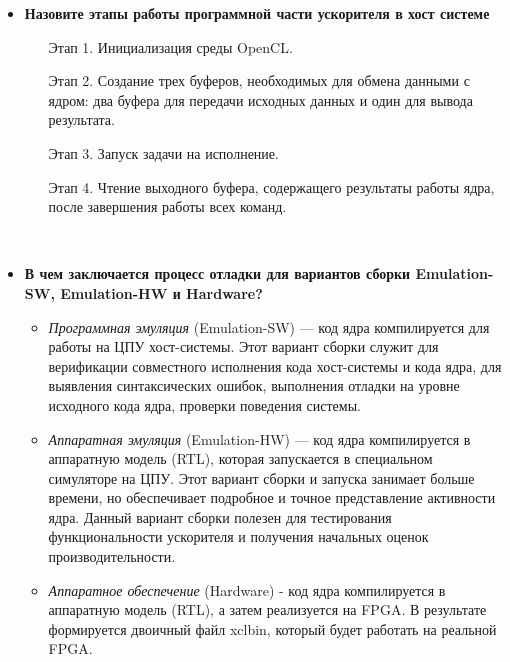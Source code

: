 \begin{itemize}[left=-0.5\parindent]
    \item \textbf{Назовите этапы работы программной части ускорителя в хост
          системе}
        \begin{enumerate}[leftmargin=\parindent]
            \item[Этап 1.] Инициализация среды OpenCL.
            \item[Этап 2.] Создание трех буферов, необходимых для
            обмена данными с ядром: два буфера для передачи исходных данных и
            один для вывода результата.
            \item[Этап 3.] Запуск задачи на исполнение.
            \item[Этап 4.] Чтение выходного буфера, содержащего результаты
            работы ядра, после завершения работы всех команд.
        \end{enumerate}
        ~\\

    \item \textbf{В чем заключается процесс отладки для вариантов сборки
          Emulation-SW, Emulation-HW и Hardware?}
        \begin{itemize}[leftmargin=\parindent]
            \item \textit{Программная эмуляция} (Emulation-SW) --- код ядра
                  компилируется для работы на ЦПУ хост-системы. Этот вариант
                  сборки служит для верификации совместного исполнения кода
                  хост-системы и кода ядра, для выявления синтаксических
                  ошибок, выполнения отладки на уровне исходного кода ядра,
                  проверки поведения системы.

            \item \textit{Аппаратная эмуляция} (Emulation-HW) --- код ядра
                  компилируется в аппаратную модель (RTL), которая запускается
                  в специальном симуляторе на ЦПУ. Этот вариант сборки и
                  запуска занимает больше времени, но обеспечивает подробное и
                  точное представление активности ядра. Данный вариант сборки
                  полезен для тестирования функциональности ускорителя и
                  получения начальных оценок производительности.

            \item \textit{Аппаратное обеспечение} (Hardware) - код ядра
                  компилируется в аппаратную модель (RTL), а затем реализуется
                  на FPGA. В результате формируется двоичный файл xclbin,
                  который будет работать на реальной FPGA.
            \end{itemize}
            ~\\


\end{itemize}

